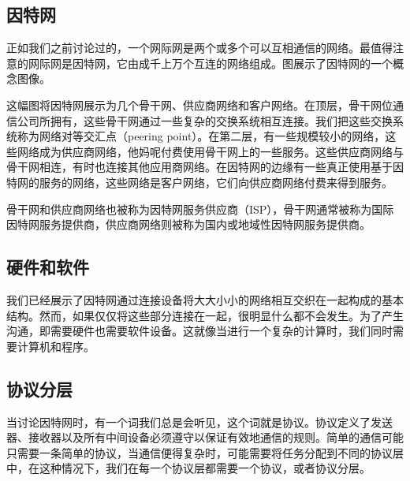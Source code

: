 \subsection{因特网}
正如我们之前讨论过的，一个网际网是两个或多个可以互相通信的网络。最值得注意的网际网是因特网，它由成千上万个互连的网络组成。图展示了因特网的一个概念图像。

这幅图将因特网展示为几个骨干网、供应商网络和客户网络。在顶层，骨干网位通信公司所拥有，这些骨干网通过一些复杂的交换系统相互连接。我们把这些交换系统称为网络对等交汇点（peering point）。在第二层，有一些规模较小的网络，这些网络成为供应商网络，他妈呢付费使用骨干网上的一些服务。这些供应商网络与骨干网相连，有时也连接其他应用商网络。在因特网的边缘有一些真正使用基于因特网的服务的网络，这些网络是客户网络，它们向供应商网络付费来得到服务。

骨干网和供应商网络也被称为因特网服务供应商（ISP），骨干网通常被称为国际因特网服务提供商，供应商网络则被称为国内或地域性因特网服务提供商。
\subsection{硬件和软件}

我们已经展示了因特网通过连接设备将大大小小的网络相互交织在一起构成的基本结构。然而，如果仅仅将这些部分连接在一起，很明显什么都不会发生。为了产生沟通，即需要硬件也需要软件设备。这就像当进行一个复杂的计算时，我们同时需要计算机和程序。

\subsection{协议分层}

当讨论因特网时，有一个词我们总是会听见，这个词就是协议。协议定义了发送器、接收器以及所有中间设备必须遵守以保证有效地通信的规则。简单的通信可能只需要一条简单的协议，当通信便得复杂时，可能需要将任务分配到不同的协议层中，在这种情况下，我们在每一个协议层都需要一个协议，或者协议分层。

